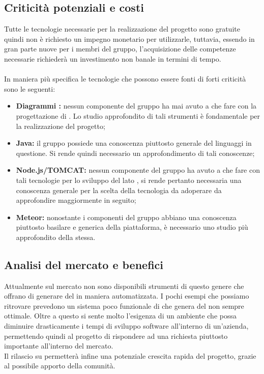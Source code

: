   \subsection{Criticità potenziali e costi}
    Tutte le tecnologie necessarie per la realizzazione del progetto sono gratuite quindi non è richiesto
    un impegno monetario per utilizzarle, tuttavia, essendo in gran parte nuove per i membri del gruppo,
    l'acquisizione delle competenze necessarie richiederà un investimento non banale in termini di
    tempo.
    \\ \\
    In maniera più specifica le tecnologie che possono essere fonti di forti criticità sono le seguenti:
      \begin{itemize}
        \item \textbf{Diagrammi :} nessun componente del gruppo ha mai avuto a che fare con la progettazione di  . Lo studio approfondito di tali strumenti è fondamentale per la realizzazione del progetto;
        \item \textbf{Java:} il gruppo possiede una conoscenza piuttosto generale del linguaggi in questione. Si rende quindi necessario un approfondimento di tali conoscenze;
        \item \textbf{Node.js/TOMCAT:} nessun componente del gruppo ha avuto a che fare con tali tecnologie per lo sviluppo del lato , si rende pertanto necessaria una conoscenza
        generale per la scelta della tecnologia da adoperare da approfondire maggiormente in seguito;
        \item \textbf{Meteor:} nonostante i componenti del gruppo abbiano una conoscenza piuttosto basilare e generica della piattaforma, è necessario uno studio più approfondito della stessa.
      \end{itemize}
  \subsection{Analisi del mercato e benefici}
    Attualmente sul mercato non sono disponibili strumenti di questo genere che offrano di generare del  in maniera automatizzata. I pochi esempi che possiamo ritrovare
    prevedono un sistema poco funzionale di  che genera del  non sempre ottimale.
    Oltre a questo si sente molto l'esigenza di un ambiente che possa diminuire drasticamente i tempi di sviluppo software all'interno di un'azienda, permettendo quindi al progetto
    di rispondere ad una richiesta piuttosto importante all'interno del mercato. \\
    Il rilascio su  permetterà infine una potenziale crescita rapida del progetto, grazie al possibile apporto della comunità.
